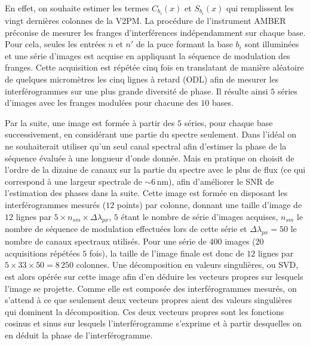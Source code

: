 En effet, on souhaite estimer les termes $C_{b_i}(x)$ et $S_{b_i}(x)$ qui remplissent les vingt dernières colonnes de la \ac{V2PM}. La procédure de l'instrument \ac{AMBER} préconise de mesurer les franges d'interférences indépendamment sur chaque base. Pour cela, seules les entrées $n$ et $n'$ de la puce formant la base $b_i$ sont illuminées et une série d'images est acquise en appliquant la séquence de modulation des franges. Cette acquisition est répétée cinq fois en translatant de manière aléatoire de quelques micromètres les cinq lignes à retard (\acrfull{ODL}) afin de mesurer les interférogrammes sur une plus grande diversité de phase. Il résulte ainsi $5$ séries d'images avec les franges modulées pour chacune des $10$ bases. 

Par la suite, une image est formée à partir des $5$ séries, pour chaque base successivement, en considérant une partie du spectre seulement. Dans l'idéal on ne souhaiterait utiliser qu'un seul canal spectral afin d'estimer la phase de la séquence évaluée à une longueur d'onde donnée. Mais en pratique on choisit de l'ordre de la dizaine de canaux sur la partie du spectre avec le plus de flux (ce qui correspond à une largeur spectrale de $\sim 6\,$nm), afin d'améliorer le \ac{SNR} de l'estimation des phases dans la suite. Cette image est formée en disposant les interférogrammes mesurés ($12$ points) par colonne, donnant une taille d'image de $12$ lignes par $5 \times n_{sm} \times \Delta\lambda_{px}$, $5$ étant le nombre de série d'images acquises, $n_{sm}$ le nombre de séquence de modulation effectuées lors de cette série et $\Delta\lambda_{px} = 50$ le nombre de canaux spectraux utilisés. Pour une série de $400$ images ($20$ acquisitions répétées $5$ fois), la taille de l'image finale est donc de $12$ lignes par $5 \times 33 \times 50 = 8\,250$ colonnes. Une décomposition en valeurs singulières, ou \ac{SVD}, est alors opérée sur cette image afin d'en déduire les vecteurs propres sur lesquels l'image se projette. Comme elle est composée des interférogrammes mesurés, on s'attend à ce que seulement deux vecteurs propres aient des valeurs singulières qui dominent la décomposition. Ces deux vecteurs propres sont les fonctions cosinus et sinus sur lesquels l'interférogramme s'exprime et à partir desquelles on en déduit la phase de l'interférogramme.

